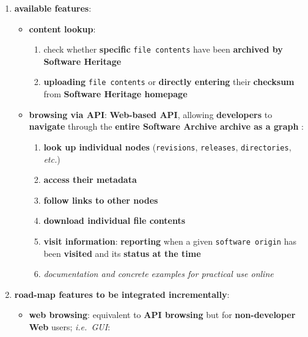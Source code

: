 \documentclass[11pt]{article}
\providecommand{\tightlist}{%
      \setlength{\itemsep}{0pt}\setlength{\parskip}{0pt}}
\begin{document}
\begin{enumerate}
\def\labelenumi{\arabic{enumi}.}
\tightlist
\item
  \textbf{available features}:

  \begin{itemize}
  \tightlist
  \item
    \textbf{content lookup}:

    \begin{enumerate}
    \def\labelenumii{\arabic{enumii}.}
    \tightlist
    \item
      check whether \textbf{specific} \texttt{file\ contents} have been
      \textbf{archived by Software Heritage}
    \item
      \textbf{uploading} \texttt{file\ contents} or \textbf{directly
      entering} their \textbf{checksum} from \textbf{Software Heritage
      homepage}
    \end{enumerate}
  \item
    \textbf{browsing via API}: \textbf{Web-based API}, allowing
    \textbf{developers} to \textbf{navigate} through the \textbf{entire
    Software Archive archive as a graph} :

    \begin{enumerate}
    \def\labelenumii{\arabic{enumii}.}
    \tightlist
    \item
      \textbf{look up individual nodes} (\texttt{revisions},
      \texttt{releases}, \texttt{directories}, \emph{etc.})
    \item
      \textbf{access their metadata}
    \item
      \textbf{follow links to other nodes}
    \item
      \textbf{download individual file contents}
    \item
      \textbf{visit information}: \textbf{reporting} when a given
      \texttt{software\ origin} has been \textbf{visited} and its
      \textbf{status at the time}
    \item
      \emph{documentation and concrete examples for practical use
      online}
    \end{enumerate}
  \end{itemize}
\item
  \textbf{road-map features to be integrated incrementally}:

  \begin{itemize}
  \tightlist
  \item
    \textbf{web browsing}: equivalent to \textbf{API browsing} but for
    \textbf{non-developer Web} users; \emph{i.e.~GUI}:


\end{itemize}
\end{enumerate}
\end{document}
